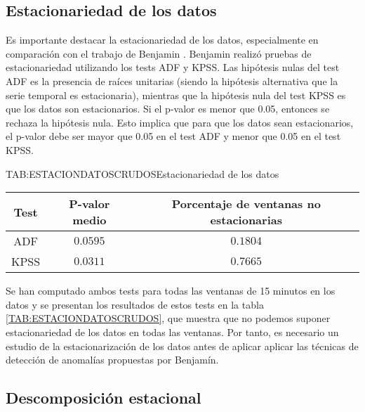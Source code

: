 
\subsection{Estacionariedad de los datos}\label{SUBSEC:ESTACIONARIEDAD}

Es importante destacar la estacionariedad de los datos, especialmente en comparación con el trabajo de Benjamin \cite{benjamin2023}. Benjamin realizó pruebas de estacionariedad utilizando los tests ADF y KPSS. Las hipótesis nulas del test ADF es la presencia de raíces unitarias (siendo la hipótesis alternativa que la serie temporal es estacionaria), mientras que la hipótesis nula del test KPSS es que los datos son estacionarios. Si el p-valor es menor que 0.05, entonces se rechaza la hipótesis nula. Esto implica que para que los datos sean estacionarios, el p-valor debe ser mayor que 0.05 en el test ADF y menor que 0.05 en el test KPSS.

\begin{table}[Estacionariedad de los datos]{TAB:ESTACIONDATOSCRUDOS}{Estacionariedad de los datos}
    \begin{tabular}{|c|c|c|}
        \hline
        \textbf{Test} & \textbf{P-valor medio} & \textbf{Porcentaje de ventanas no estacionarias} \\
        \hline
        ADF & $0.0595$ & $0.1804$ \\
        KPSS & $0.0311$ & $0.7665$ \\
        \hline
    \end{tabular}
\end{table}

Se han computado ambos tests para todas las ventanas de 15 minutos en los datos y se presentan los resultados de estos tests en la tabla \ref{TAB:ESTACIONDATOSCRUDOS}, que muestra que no podemos suponer estacionariedad de los datos en todas las ventanas. Por tanto, es necesario un estudio de la estacionarización de los datos antes de aplicar aplicar las técnicas de detección de anomalías propuestas por Benjamín.

\subsection{Descomposición estacional}\label{SUBSEC:DESESTACIONALIDAD}

